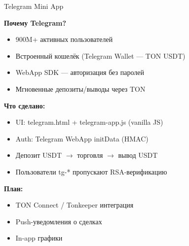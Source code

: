 \documentclass[aspectratio=169]{beamer}
\begin{document}
\begin{frame}{Telegram Mini App}

\textbf{Почему Telegram?}

\begin{itemize}
    \item 900M+ активных пользователей
    \item Встроенный кошелёк (Telegram Wallet --- TON USDT)
    \item WebApp SDK --- авторизация без паролей
    \item Мгновенные депозиты/выводы через TON
\end{itemize}

\textbf{Что сделано:}
\begin{itemize}
    \item UI: telegram.html + telegram-app.js (vanilla JS)
    \item Auth: Telegram WebApp initData (HMAC)
    \item Депозит USDT $\to$ торговля $\to$ вывод USDT
    \item Пользователи tg-* пропускают RSA-верификацию
\end{itemize}

\textbf{План:}
\begin{itemize}
    \item TON Connect / Tonkeeper интеграция
    \item Push-уведомления о сделках
    \item In-app графики
\end{itemize}
\end{frame}
\end{document}
